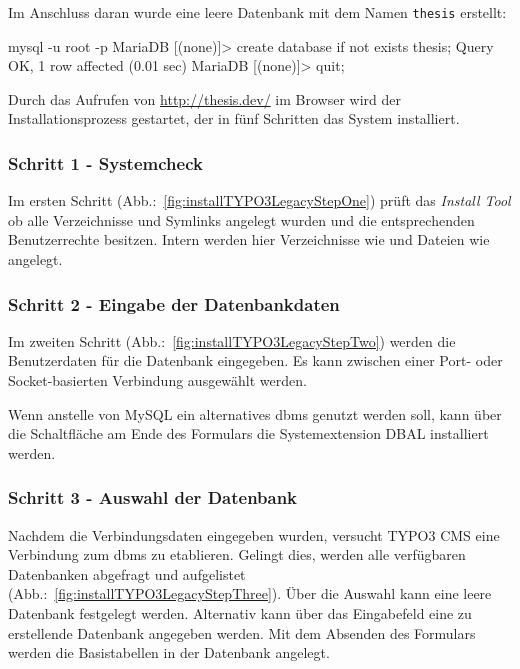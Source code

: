 Im Anschluss daran wurde eine leere Datenbank mit dem Namen \texttt{thesis} erstellt:

\begin{shcode}
mysql -u root -p
MariaDB [(none)]> create database if not exists thesis;
Query OK, 1 row affected (0.01 sec)
MariaDB [(none)]> quit;
\end{shcode}

Durch das Aufrufen von \url{http://thesis.dev/} im Browser wird der Installationsprozess gestartet, der in fünf Schritten das System installiert.

\subsubsection{Schritt 1 - Systemcheck}
\label{prototype:subsec:OneSystemcheck}
	Im ersten Schritt (Abb.:~\ref{fig:installTYPO3LegacyStepOne}) prüft das \textit{Install Tool} ob alle Verzeichnisse und Symlinks angelegt wurden und die entsprechenden Benutzerrechte besitzen. Intern werden hier Verzeichnisse wie  und Dateien wie  angelegt.

\subsubsection{Schritt 2 - Eingabe der Datenbankdaten}
\label{prototype:subsec:TwoInsertDatabaseData}
	Im zweiten Schritt (Abb.:~\ref{fig:installTYPO3LegacyStepTwo}) werden die Benutzerdaten für die Datenbank eingegeben. Es kann zwischen einer Port- oder Socket-basierten Verbindung ausgewählt werden.

	Wenn anstelle von MySQL ein alternatives \gls{dbms} genutzt werden soll, kann über die Schaltfläche am Ende des Formulars die Systemextension DBAL installiert werden.

\subsubsection{Schritt 3 - Auswahl der Datenbank}
\label{prototype:subsec:ThreeSelectDatabase}
	Nachdem die Verbindungsdaten eingegeben wurden, versucht TYPO3 CMS eine Verbindung zum \gls{dbms} zu etablieren. Gelingt dies, werden alle verfügbaren Datenbanken abgefragt und aufgelistet (Abb.:~\ref{fig:installTYPO3LegacyStepThree}). Über die Auswahl kann eine leere Datenbank festgelegt werden. Alternativ kann über das Eingabefeld eine zu erstellende Datenbank angegeben werden. Mit dem Absenden des Formulars werden die Basistabellen in der Datenbank angelegt.

